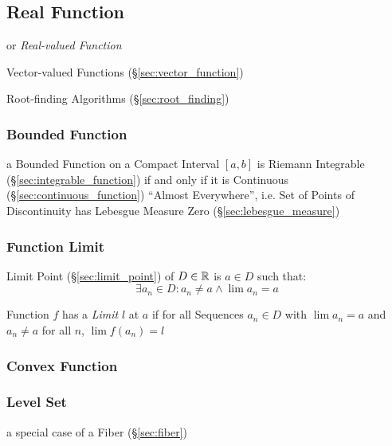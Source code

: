 \subsection{Real Function}\label{sec:real_function}

or \emph{Real-valued Function}

\fist Vector-valued Functions (\S\ref{sec:vector_function})

\fist Root-finding Algorithms (\S\ref{sec:root_finding})



\subsubsection{Bounded Function}\label{sec:bounded_function}

a Bounded Function on a Compact Interval $[a,b]$ is Riemann Integrable
(\S\ref{sec:integrable_function}) if and only if it is Continuous
(\S\ref{sec:continuous_function}) ``Almost Everywhere'', i.e. Set of Points of
Discontinuity has Lebesgue Measure Zero (\S\ref{sec:lebesgue_measure})



\subsubsection{Function Limit}\label{sec:function_limit}

Limit Point (\S\ref{sec:limit_point}) of $D \in \mathbb{R}$ is $a \in D$
such that:
\[
  \exists a_n \in D : a_n \neq a \wedge \lim a_n = a
\]

Function $f$ has a \emph{Limit} $l$ at $a$ if for all Sequences $a_n
\in D$ with $\lim a_n = a$ and $a_n \neq a$ for all $n$, $\lim f(a_n)
= l$



\subsubsection{Convex Function}\label{sec:convex_function}

\subsubsection{Level Set}\label{sec:level_set}

a special case of a Fiber (\S\ref{sec:fiber})



